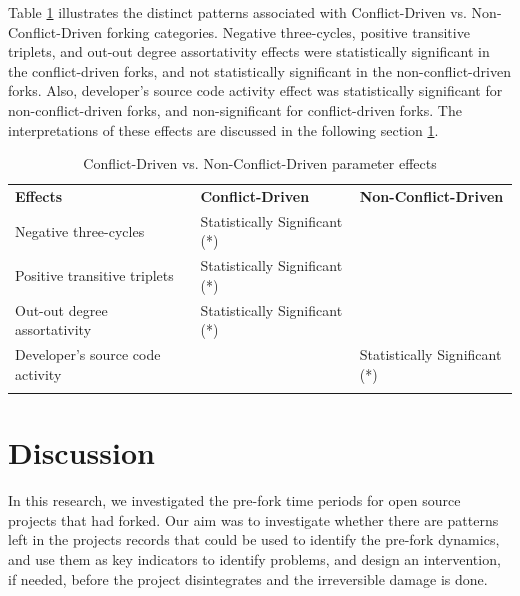 \documentclass[12pt,letterpaper]{gthesis2}  %
\begin{document}
\pagebreak
\doublespacing

Table \ref{summaryConflictVsNonConflict} illustrates the distinct patterns associated with Conflict-Driven vs. Non-Conflict-Driven forking categories.
Negative three-cycles, positive transitive triplets, and out-out degree assortativity effects were statistically significant in the conflict-driven forks, and not statistically significant in the non-conflict-driven forks. Also, developer’s source code activity effect was statistically significant for non-conflict-driven forks, and non-significant for conflict-driven forks. The interpretations of these effects are discussed in the following section \ref{Discussion}. \\

\begin{table}[!htbp]
\caption{Conflict-Driven vs. Non-Conflict-Driven parameter effects}
\label{summaryConflictVsNonConflict} 
\begin{tabular}{l l l}
\hline\noalign{\smallskip}
\textbf{Effects} & \textbf{Conflict-Driven} & \textbf{Non-Conflict-Driven}\\
\noalign{\smallskip}\hline\noalign{\smallskip}
Negative three-cycles & {\footnotesize Statistically Significant (*)} &  \\ \hline
Positive transitive triplets & {\footnotesize Statistically Significant (*)}  & \\ \hline
Out-out degree assortativity & {\footnotesize Statistically Significant (*)} & \\ \hline
Developer’s source code activity &  & {\footnotesize Statistically Significant (*)} \\
\noalign{\smallskip}\hline
\end{tabular}
\end{table}


\section{Discussion}
\label{Discussion}

In this research, we investigated the pre-fork time periods for open source projects that had forked. Our aim was to investigate whether there are patterns left in the projects records that could be used to identify the pre-fork dynamics, and use them as key indicators to identify problems, and design an intervention, if needed, before the project disintegrates and the irreversible damage is done. \\
\end{document}

